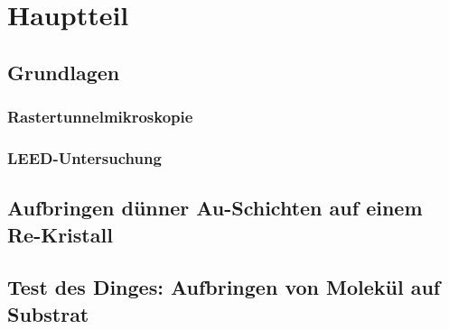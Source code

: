 \documentclass[a4paper,11pt,oneside,final,german,openbib,pdftex]{scrbook}
\begin{document}
\chapter{Hauptteil}


\section{Grundlagen}

% 
\subsection{Rastertunnelmikroskopie}

\subsection{LEED-Untersuchung}



% 
 
\section{Aufbringen dünner Au-Schichten auf einem Re-Kristall}

 
\section{Test des Dinges: Aufbringen von Molekül auf Substrat} \label{kaptest}




% 
\end{document}
